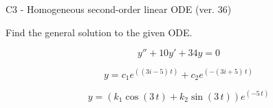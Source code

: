\begin{exercise}
  \begin{exerciseTitle}C3 - Homogeneous second-order linear ODE (ver. 36)\end{exerciseTitle}
  \begin{exerciseStatement}
    
Find the general solution to the given ODE.

    
\[y''+10y'+34y = 0\]

  \end{exerciseStatement}
  \begin{exerciseAnswer}
    
\[y= c_{1} e^{\left(\left(3 i - 5\right) \, t\right)} + c_{2} e^{\left(-\left(3 i + 5\right) \, t\right)}\]

    
\[y= {\left(k_{1} \cos\left(3 \, t\right) + k_{2} \sin\left(3 \, t\right)\right)} e^{\left(-5 \, t\right)}\]

  \end{exerciseAnswer}
\end{exercise}